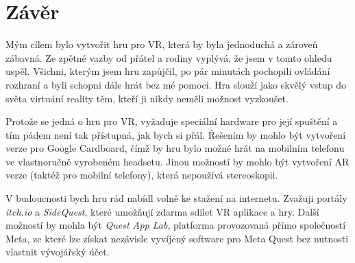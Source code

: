 \chapter*{Závěr}

Mým cílem bylo vytvořit hru pro VR, která by byla jednoduchá a zároveň zábavná. Ze zpětné vazby od přátel a rodiny vyplývá, že jsem v tomto ohledu uspěl. Všichni, kterým jsem hru zapůjčil, po pár minutách pochopili ovládání rozhraní a byli schopni dále hrát bez mé pomoci. Hra slouží jako skvělý vstup do světa virtuání reality těm, kteří ji nikdy neměli možnost vyzkoušet.

Protože se jedná o hru pro VR, vyžaduje speciální hardware pro její spuštění a tím pádem není tak přístupná, jak bych si přál. Řešením by mohlo být vytvoření verze pro Google Cardboard, čímž by hru bylo možné hrát na mobilním telefonu ve vlastnoručně vyrobeném headsetu. Jinou možností by mohlo být vytvoření AR verze (taktéž pro mobilní telefony), která nepoužívá stereoskopii.

V budoucnosti bych hru rád nabídl volně ke stažení na internetu. Zvažuji portály \textit{itch.io} a \textit{SideQuest}, které umožňují zdarma sdílet VR aplikace a hry. Další možností by mohla být \textit{Quest App Lab}, platforma provozovaná přímo společností Meta, ze které lze získat nezávisle vyvíjený software pro Meta Quest bez nutnosti vlastnit vývojářský účet.